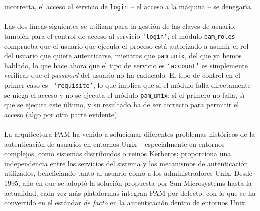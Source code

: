 incorrecta, el acceso al servicio de {\tt login} -- el acceso a la m\'aquina --
se denegar\'{\i}a.\\
\\Las dos l\'{\i}neas siguientes se utilizan para la gesti\'on de las claves
de usuario, tambi\'en para el control de acceso al servicio {\tt `login'}; el
m\'odulo {\tt pam$\_$roles} comprueba que el usuario que ejecuta el proceso
est\'a autorizado a asumir el rol del usuario que quiere autenticarse, mientras 
que {\tt pam$\_$unix}, del que ya hemos hablado, lo que hace ahora que el tipo 
de servicio es {\tt `account'} es simplemente verificar que el {\it password} 
del usuario no ha caducado. El tipo de control en el primer caso es {\tt 
`requisite'}, lo que implica que si el m\'odulo falla directamente se niega el
acceso y no se ejecuta el m\'odulo {\tt pam$\_$unix}; si el primero no falla,
s\'{\i} que se ejecuta este \'ultimo, y su resultado ha de ser correcto para
permitir el acceso (algo por otra parte evidente).\\
\\La arquitectura PAM ha venido a solucionar diferentes problemas hist\'oricos
de la autenticaci\'on de usuarios en entornos Unix -- especialmente en entornos
complejos, como sistemas distribuidos o reinos Kerberos; proporciona una
independencia entre los servicios del sistema y los mecanismos de 
autenticaci\'on utilizados, beneficiando tanto al usuario como a los 
administradores Unix. Desde 1995, a\~no en que se adopt\'o la soluci\'on 
propuesta por Sun Microsystems hasta la actualidad, cada vez m\'as plataformas 
integran PAM por defecto, con lo que se ha convertido en el est\'andar {\it 
de facto} en la autenticaci\'on dentro de entornos Unix.
